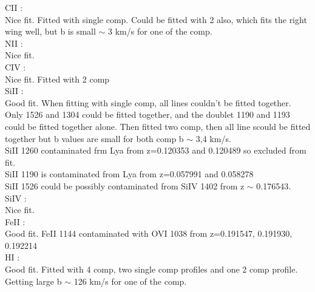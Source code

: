 \documentclass[12pt]{report}
\begin{document}
CII :  \\  \hspace*{1.5cm}
        Nice fit. Fitted with single comp. Could be fitted with 2 also, which fits the right wing well, but b is small  $\sim$ 3 km/s for one of the  comp.  \\

NII :  \\  \hspace*{1.5cm}
        Nice fit.  \\

CIV :  \\  \hspace*{1.5cm}
        Nice fit. Fitted with 2 comp  \\

SiII :  \\  \hspace*{1.5cm}
        Good fit. When fitting with single comp, all lines couldn't be fitted together. Only 1526 and 1304 could be fitted together, and the doublet 1190 and 1193 could be fitted together alone. Then fitted two comp, then all line scould be fitted together but b values are small for both comp b $\sim$  3,4 km/s. \\ 
        SiII 1260 contaminated frm Lya from z=0.120353 and 0.120489 so excluded from fit.  \\
        SiII 1190 is contaminated from Lya from z=0.057991 and 0.058278 \\
        SiII 1526 could be possibly contaminated from SiIV 1402 from z $\sim$ 0.176543. \\

SiIV :  \\  \hspace*{1.5cm}
        Nice fit.  \\

FeII :  \\  \hspace*{1.5cm}
        Good fit. FeII 1144 contaminated with OVI 1038 from z=0.191547, 0.191930, 0.192214  \\

HI :  \\  \hspace*{1.5cm}
        Good fit. Fitted with 4 comp, two single comp profiles and one 2 comp profile. Getting large b  $\sim$  126 km/s for one of the comp.  \\



\newpage
\end{document}
